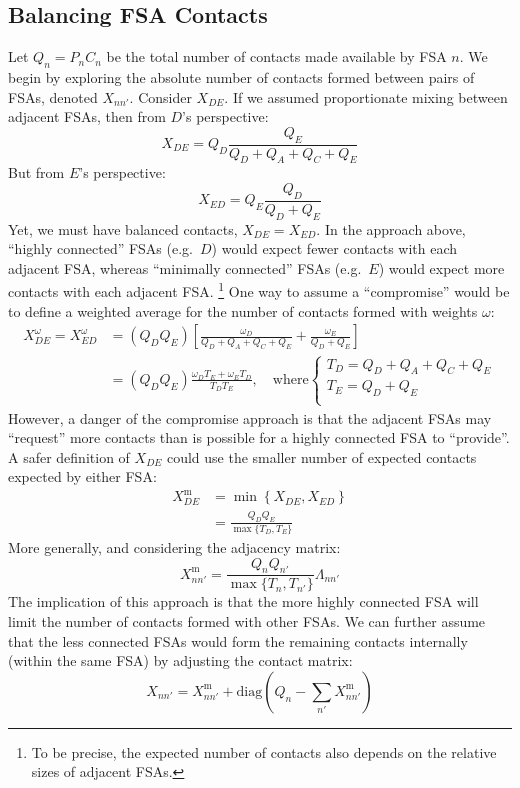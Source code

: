 \documentclass{article}
\def\Xm{X^{\mathrm{m}}}
\begin{document}
  \subsection{Balancing FSA Contacts}
  Let $Q_n = P_n C_n$ be the total number of contacts made available by FSA $n$.
  We begin by exploring the absolute number of contacts formed between pairs of FSAs, denoted $X_{nn'}$.
  Consider $X_{DE}$. If we assumed proportionate mixing between adjacent FSAs, then from $D$'s perspective:
  \begin{equation}
    X_{DE} = Q_D \frac{Q_E}{Q_D + Q_A + Q_C + Q_E}
  \end{equation}
  But from $E$'s perspective:
  \begin{equation}
    X_{ED} = Q_E \frac{Q_D}{Q_D + Q_E}
  \end{equation}
  Yet, we must have balanced contacts, $X_{DE} = X_{ED}$.
  In the approach above, ``highly connected'' FSAs (e.g.~$D$)
  would expect fewer contacts with each adjacent FSA,
  whereas ``minimally connected'' FSAs (e.g.~$E$)
  would expect more contacts with each adjacent FSA.%
  \footnote{To be precise, the expected number of contacts also depends on
    the relative sizes of adjacent FSAs.}
  One way to assume a ``compromise'' would be to define a weighted average for the number of contacts formed
  with weights $\omega$:
  \begin{align}
    X^\omega_{DE} = X^\omega_{ED}
    &= (Q_D Q_E) \left[\frac{\omega_D}{Q_D + Q_A + Q_C + Q_E}+\frac{\omega_E}{Q_D + Q_E}\right]\\
    &= (Q_D Q_E) \frac{\omega_D T_E + \omega_E T_D}{T_D T_E},\quad\textrm{where}
    \begin{cases}
      T_D = Q_D + Q_A + Q_C + Q_E\\
      T_E = Q_D + Q_E\\
    \end{cases}\nonumber
  \end{align}
  However, a danger of the compromise approach is that
  the adjacent FSAs may ``request'' more contacts than is possible for a highly connected FSA to ``provide''.
  A safer definition of $X_{DE}$ could use the smaller number of expected contacts expected by either FSA:
  \begin{align}
    \Xm_{DE}
    &= \min{\left\{X_{DE},X_{ED}\right\}}\\
    &= \frac{Q_D Q_E}{\max{\{T_D,T_E\}}}\nonumber
  \end{align}
  More generally, and considering the adjacency matrix:
  \begin{equation}
    \Xm_{nn'} = \frac{Q_{n} Q_{n'}}{\max{\{T_{n},T_{n'}\}}}\Lambda_{nn'}
  \end{equation}
  The implication of this approach is that the more highly connected FSA will limit
  the number of contacts formed with other FSAs.
  We can further assume that the less connected FSAs would form the remaining contacts internally (within the same FSA)
  by adjusting the contact matrix:
  \begin{equation}
    X_{nn'} =  \Xm_{nn'} + \mathrm{diag}\left(Q_n-\sum_{n'} \Xm_{nn'}\right)
  \end{equation}
\end{document}

